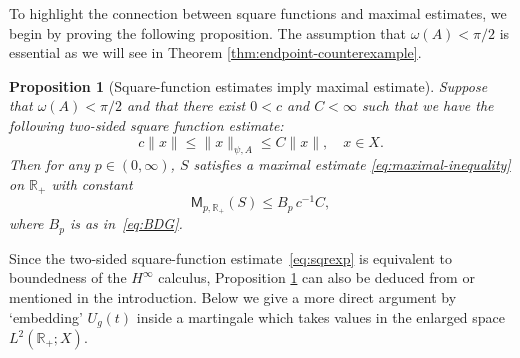 \documentclass[11pt]{amsart}
\newtheorem{proposition}[theorem]{Proposition}
\theoremstyle{definition}
\theoremstyle{remark}
\numberwithin{equation}{section}
\newcommand{\R}{\mathbb R}
\newcommand{\1}{\mathbf 1}
\newcommand{\cM}{\mathsf{M}}
\newcommand{\norm}[1]{\lVert #1\rVert}
\begin{document}
To highlight the connection between square functions and maximal estimates, we begin by proving the following proposition.
The assumption that $\omega(A)<\pi/2$ is essential as we will see in Theorem \ref{thm:endpoint-counterexample}. 

\begin{proposition}[Square-function estimates imply maximal estimate]\label{prop:Maxsquare}
    Suppose that $\omega(A) < \pi / 2$ and that there exist $0 < c$ and $C < \infty$ such that we have the following two-sided square function estimate:
\begin{equation}
    \label{eq:sqrexp}
    c \norm{x}
    \leq \norm{x}_{\psi,A} \leq C \norm{x}, \quad x \in X.
\end{equation}
Then for any $p \in (0,\infty)$, $S$ satisfies a maximal estimate \eqref{eq:maximal-inequality} on $\R_+$ with constant
\begin{equation*}
    \cM_{p,\R_+}(S) \leq B_p\, c^{-1}C,
\end{equation*}
where $B_p$ is as in~\eqref{eq:BDG}.
\end{proposition}
Since the two-sided square-function estimate~\eqref{eq:sqrexp} is equivalent to boundedness of the $H^\infty$ calculus, Proposition \ref{prop:Maxsquare} can also be deduced from \cite[Theorem 2.2]{Sei10} or \cite[Theorem 1.1]{VeraarWeis2011} mentioned in the introduction. Below we give a more direct argument by `embedding' $U_g(t)$ inside a martingale which takes values in the enlarged space $L^2(\R_+;X)$.
\end{document}
